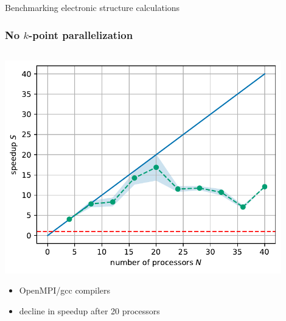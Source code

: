 \documentclass[aspectratio=169]{beamer}
\begin{document}

\begin{frame}
	\begin{center}
		{\huge Benchmarking electronic structure calculations}
	\end{center}
\end{frame}

\begin{frame}
	\frametitle{No \(k\)-point parallelization}
	
	\begin{columns}
		\begin{column}{0.5\textwidth}
			\includegraphics[width=0.9\textwidth]{figs/TaS2_ompi_bench_nprocs_speedup.pdf}
			\begin{itemize}
				\item OpenMPI/gcc compilers
				\item decline in speedup after 20 processors
			\end{itemize}
		\end{column}


\end{columns}
\end{frame}
\end{document}
